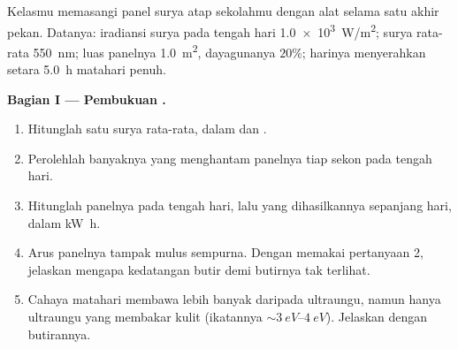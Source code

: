\begin{problem}
\label{pb:g12:quantum-world:1}
Kelasmu memasangi panel surya atap sekolahmu dengan alat selama satu akhir pekan.
Datanya: iradiansi surya pada tengah hari \qty{1.0e3}{W/m^2};  surya rata-rata
\qty{550}{nm}; luas panelnya \qty{1.0}{m^2}, dayagunanya $20\%$; harinya
menyerahkan setara \qty{5.0}{h} matahari penuh.

\medskip
\noindent\textbf{Bagian I --- Pembukuan .}
\begin{enumerate}
  \item Hitunglah  satu  surya rata-rata, dalam  dan .
  \item Perolehlah banyaknya  yang menghantam panelnya tiap sekon pada tengah hari.
  \item Hitunglah  panelnya pada tengah hari, lalu  yang
        dihasilkannya sepanjang hari, dalam \unit{kW.h}.
  \item Arus panelnya tampak mulus sempurna. Dengan memakai pertanyaan 2,
        jelaskan mengapa kedatangan butir demi butirnya tak terlihat.
  \item Cahaya matahari membawa lebih banyak   daripada ultraungu, namun hanya
        ultraungu yang membakar kulit (ikatannya $\sim \qtyrange{3}{4}{eV}$). Jelaskan dengan butirannya.
\end{enumerate}


\end{problem}
